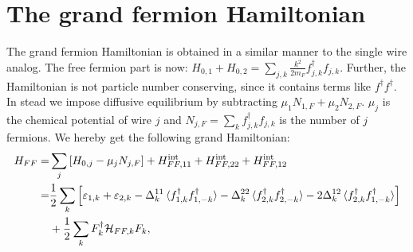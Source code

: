 \section{The grand fermion Hamiltonian}
\label{sec.2wiresgrandHFF}
The grand fermion Hamiltonian is obtained in a similar manner to the single wire analog. The free fermion part is now: $H_{0,1}+H_{0,2} = \sum_{j,k}\frac{k^2}{2m_F}f^\dagger_{j,k}f_{j,k}$. Further, the Hamiltonian is not particle number conserving, since it contains terms like $f^\dagger f^\dagger$. In stead we impose diffusive equilibrium by subtracting $\mu_1N_{1,F}+\mu_2N_{2,F}$. $\mu_j$ is the chemical potential of wire $j$ and $N_{j,F} = \sum_k f^\dagger_{j,k}f_{j,k}$ is the number of $j$ fermions. We hereby get the following grand Hamiltonian:
\begin{align}
H_{FF} = &\sum_j \left[H_{0,j} - \mu_j N_{j,F}\right] + H^\text{int}_{FF,11} + H^\text{int}_{FF,22} + H^\text{int}_{FF,12} \nonumber \\
       = &\frac{1}{2}\sum_k\left[\varepsilon_{1,k} + \varepsilon_{2,k} - \Delta^{11}_k\braket{f^\dagger_{1,k}f^\dagger_{1,-k}} - \Delta^{22}_k\braket{f^\dagger_{2,k}f^\dagger_{2,-k}} - 2\Delta^{12}_k\braket{f^\dagger_{2,k}f^\dagger_{1,-k}} \right] \nonumber \\
       & + \frac{1}{2}\sum_k F^\dagger_k \mathcal{H}_{FF,k}F_k,
\end{align}

